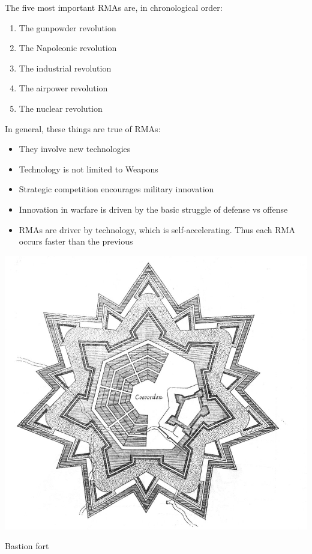 \documentclass[nobib]{tufte-handout}
\begin{document}
The five most important RMAs are, in chronological order:
\begin{enumerate}
    \item The gunpowder revolution
    \item The Napoleonic revolution
    \item The industrial revolution
    \item The airpower revolution
    \item The nuclear revolution
\end{enumerate}
In general, these things are true of RMAs:
\begin{itemize}
    \item They involve new technologies
    \item Technology is not limited to Weapons
    \item Strategic competition encourages military innovation
    \item Innovation in warfare is driven by the basic struggle of defense vs offense
    \item RMAs are driver by technology, which is self-accelerating. Thus each RMA occurs faster than the previous
\end{itemize}

\begin{marginfigure}
    \includegraphics{Coevorden.jpg}
    \caption{Bastion fort}
    \label{bastion}
\end{marginfigure}
\end{document}
